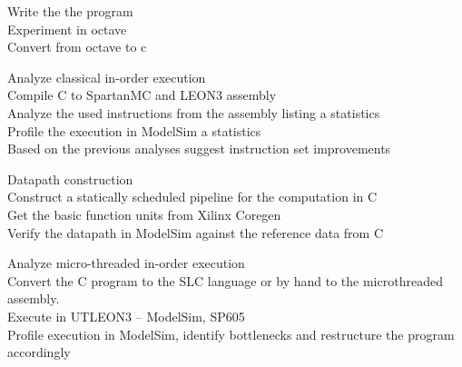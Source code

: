 \documentclass[a4paper]{scrartcl}
\begin{document}
	\begin{description}
		\item Write the the program \\
		Experiment in octave \\
		Convert from octave to c \\
		
		\item Analyze classical in-order execution \\
		Compile C to SpartanMC and LEON3 assembly \\
		Analyze the used instructions from the assembly listing a statistics \\
		Profile the execution in ModelSim a statistics \\
		Based on the previous analyses suggest instruction set improvements \\
		
		\item Datapath construction \\
		Construct a statically scheduled pipeline for the computation in C \\
		Get the basic function units from Xilinx Coregen \\
		Verify the datapath in ModelSim against the reference data from C\\
		
		\item Analyze micro-threaded in-order execution \\
		Convert the C program to the SLC language or by hand to the microthreaded assembly. \\
		Execute in UTLEON3 – ModelSim, SP605 \\
		Profile execution in ModelSim, identify bottlenecks and restructure the program accordingly \\
	\end{description}
	
\end{document}
